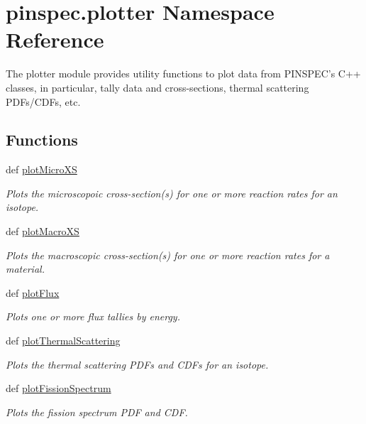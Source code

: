 \hypertarget{namespacepinspec_1_1plotter}{\section{pinspec.\-plotter Namespace Reference}
\label{namespacepinspec_1_1plotter}
}


The plotter module provides utility functions to plot data from P\-I\-N\-S\-P\-E\-C's C++ classes, in particular, tally data and cross-\/sections, thermal scattering P\-D\-Fs/\-C\-D\-Fs, etc.  


\subsection*{Functions}
\begin{DoxyCompactItemize}
\item 
def \hyperlink{namespacepinspec_1_1plotter_a9310520b2e86be0e353ca47aed9daab1}{plot\-Micro\-X\-S}
\begin{DoxyCompactList}\small\item\em Plots the microscopoic cross-\/section(s) for one or more reaction rates for an isotope. \end{DoxyCompactList}\item 
def \hyperlink{namespacepinspec_1_1plotter_a43bdaa25a0a79c03b4082523d529f1ef}{plot\-Macro\-X\-S}
\begin{DoxyCompactList}\small\item\em Plots the macroscopic cross-\/section(s) for one or more reaction rates for a material. \end{DoxyCompactList}\item 
def \hyperlink{namespacepinspec_1_1plotter_a28bc000c574cd5986a481dc2870d7b09}{plot\-Flux}
\begin{DoxyCompactList}\small\item\em Plots one or more flux tallies by energy. \end{DoxyCompactList}\item 
def \hyperlink{namespacepinspec_1_1plotter_a4ba46d55fc5d6e970c4f4bceefbd1990}{plot\-Thermal\-Scattering}
\begin{DoxyCompactList}\small\item\em Plots the thermal scattering P\-D\-Fs and C\-D\-Fs for an isotope. \end{DoxyCompactList}\item 
def \hyperlink{namespacepinspec_1_1plotter_a6711829dda3c540c331ff0dce8eacd85}{plot\-Fission\-Spectrum}
\begin{DoxyCompactList}\small\item\em Plots the fission spectrum P\-D\-F and C\-D\-F. \end{DoxyCompactList}\item 

\end{DoxyCompactItemize}
